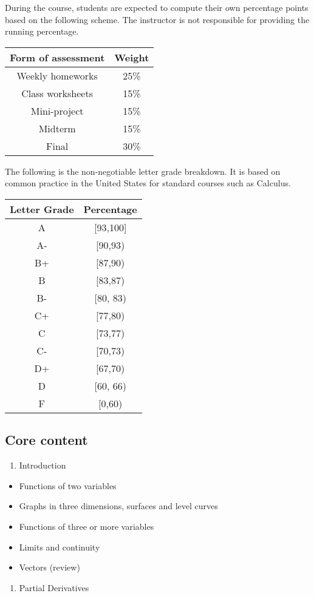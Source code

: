 \documentclass[
]{article}
\providecommand{\tightlist}{%
  \setlength{\itemsep}{0pt}\setlength{\parskip}{0pt}}
\begin{document}
During the course, students are expected to compute their own percentage
points based on the following scheme.
The instructor is not responsible for providing the running percentage.

\begin{longtable}[]{@{}cc@{}}
\toprule
\textbf{Form of assessment} & \textbf{Weight}\tabularnewline
\midrule
\endhead
Weekly homeworks & 25\%\tabularnewline
Class worksheets & 15\%\tabularnewline
Mini-project & 15\%\tabularnewline
Midterm & 15\%\tabularnewline
Final & 30\%\tabularnewline
\bottomrule
\end{longtable}

The following is the non-negotiable letter grade breakdown. It is based on
common practice in the United States for standard courses such as Calculus.

\begin{longtable}[]{@{}cc@{}}
\toprule
\textbf{Letter Grade} & \textbf{Percentage}\tabularnewline
\midrule
\endhead
A & {[}93,100{]}\tabularnewline
A- & {[}90,93)\tabularnewline
B+ & {[}87,90)\tabularnewline
B & {[}83,87)\tabularnewline
B- & {[}80, 83)\tabularnewline
C+ & {[}77,80)\tabularnewline
C & {[}73,77)\tabularnewline
C- & {[}70,73)\tabularnewline
D+ & {[}67,70)\tabularnewline
D & {[}60, 66)\tabularnewline
F & {[}0,60)\tabularnewline
\bottomrule
\end{longtable}

\hypertarget{core-content}{%
\subsection*{Core content}\label{core-content}}

\begin{enumerate}
\def\labelenumi{\arabic{enumi}.}
\tightlist
\item
  Introduction
\end{enumerate}

\begin{itemize}
\tightlist
\item
  Functions of two variables
\item
  Graphs in three dimensions, surfaces and level curves
\item
  Functions of three or more variables
\item
  Limits and continuity
\item
  Vectors (review)
\end{itemize}

\begin{enumerate}
\def\labelenumi{\arabic{enumi}.}
\setcounter{enumi}{1}
\tightlist
\item
  Partial Derivatives
\end{enumerate}
\end{document}
